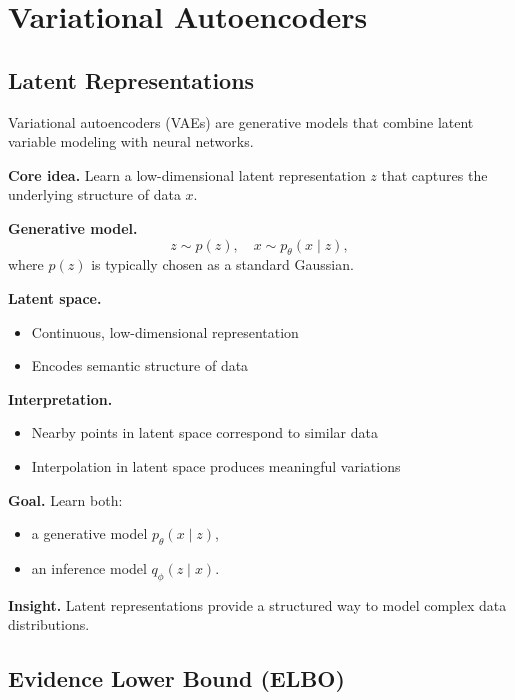\chapter{Variational Autoencoders}

\section{Latent Representations}

Variational autoencoders (VAEs) are generative models that combine latent variable modeling with neural networks.

\medskip

\noindent
\textbf{Core idea.}  
Learn a low-dimensional latent representation $z$ that captures the underlying structure of data $x$.

\medskip

\noindent
\textbf{Generative model.}
\[
z \sim p(z), \quad x \sim p_\theta(x \mid z),
\]
where $p(z)$ is typically chosen as a standard Gaussian.

\medskip

\noindent
\textbf{Latent space.}
\begin{itemize}
    \item Continuous, low-dimensional representation
    \item Encodes semantic structure of data
\end{itemize}

\medskip

\noindent
\textbf{Interpretation.}
\begin{itemize}
    \item Nearby points in latent space correspond to similar data
    \item Interpolation in latent space produces meaningful variations
\end{itemize}

\medskip

\noindent
\textbf{Goal.}  
Learn both:
\begin{itemize}
    \item a generative model $p_\theta(x \mid z)$,
    \item an inference model $q_\phi(z \mid x)$.
\end{itemize}

\medskip

\noindent
\textbf{Insight.}  
Latent representations provide a structured way to model complex data distributions.

\section{Evidence Lower Bound (ELBO)}


